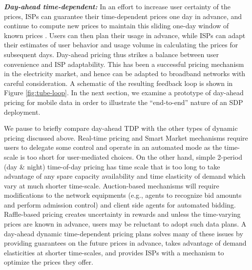 \textbf{\emph{Day-ahead time-dependent:}} In an effort to increase user certainty of the prices, ISPs can guarantee their time-dependent prices one day in advance, and continue to compute new prices to maintain this sliding one-day window of known prices \cite{ha2012tube,Carlee}. Users can then plan their usage in advance, while ISPs can adapt their estimates of user behavior and usage volume in calculating the prices for subsequent days. Day-ahead pricing thus strikes a balance between user convenience and ISP adaptability. This has been a successful pricing mechanism in the electricity market, and hence can be adapted to broadband networks with careful consideration. A schematic of the resulting feedback loop is shown in Figure \ref{fig:tube-loop}. In the next section, we examine a prototype of day-ahead pricing for mobile data in order to illustrate the ``end-to-end'' nature of an SDP deployment.

We pause to briefly compare day-ahead TDP with the other types of dynamic pricing discussed above. Real-time pricing and Smart Market mechanisms require users to delegate some control and operate in an automated mode as the time-scale is too short for user-mediated choices. On the other hand, simple 2-period (day \& night) time-of-day pricing has time scale that is too long to take advantage of any spare capacity availability and time elasticity of demand which vary at much shorter time-scale. Auction-based mechanisms will require modifications to the network equipments (e.g., agents to recognize bid amounts and perform admission control) and client side agents for automated bidding. Raffle-based pricing creates uncertainty in rewards and unless the time-varying prices are known in advance, users may be reluctant to adopt such data plans. A day-ahead dynamic time-dependent pricing plans solves many of these issues by providing guarantees on the future prices in advance, takes advantage of demand elasticities at shorter time-scales, and provides ISPs with a mechanism to optimize the prices they offer.  

